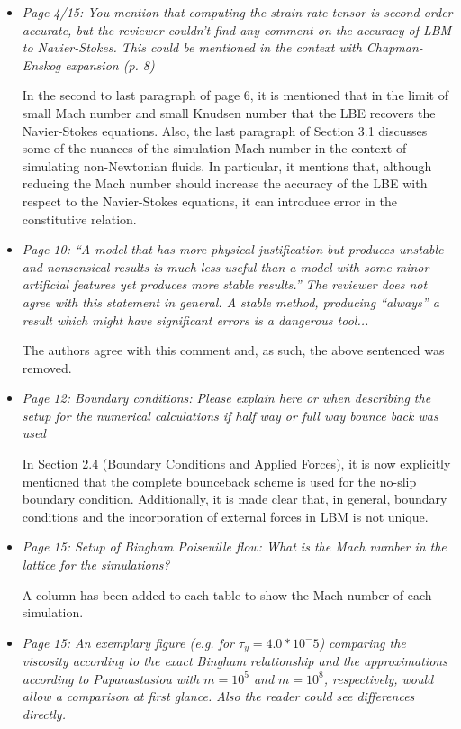 \documentclass{article}
\begin{document}
\begin{itemize}
	\item \emph{Page 4/15: You mention that computing the strain rate tensor is second order
		accurate, but the reviewer couldn’t find any comment on the accuracy of LBM to
		Navier-Stokes. This could be mentioned in the context with Chapman-Enskog
		expansion (p. 8)}
	
	In the second to last paragraph of page 6, it is mentioned that in the limit of small Mach number and small Knudsen number that the LBE recovers the Navier-Stokes equations.
	Also, the last paragraph of Section 3.1 discusses some of the nuances of the simulation Mach number in the context of simulating non-Newtonian fluids.
	In particular, it mentions that, although reducing the Mach number should increase the accuracy of the LBE with respect to the Navier-Stokes equations, it can introduce error in the constitutive relation.
	
	\item \emph{Page 10: ``A model that has more physical justification but produces unstable and
		nonsensical results is much less useful than a model with some minor artificial
		features yet produces more stable results.'' The reviewer does not agree with this
		statement in general. A stable method, producing ``always'' a result which might have
		significant errors is a dangerous tool...}
	
	The authors agree with this comment and, as such, the above sentenced was removed.
	
	\item \emph{Page 12: Boundary conditions: Please explain here or when describing the setup for
		the numerical calculations if half way or full way bounce back was used}
	
	In Section 2.4 (Boundary Conditions and Applied Forces), it is now explicitly mentioned that the complete bounceback scheme is used for the no-slip boundary condition.
	Additionally, it is made clear that, in general, boundary conditions and the incorporation of external forces in LBM is not unique.
	
	\item \emph{Page 15: Setup of Bingham Poiseuille flow: What is the Mach number in the lattice
		for the simulations?}
	
	A column has been added to each table to show the Mach number of each simulation.
	
	\item \emph{Page 15: An exemplary figure (e.g. for $\tau_y = 4.0*10^-5$) comparing the viscosity
		according to the exact Bingham relationship and the approximations according to
		Papanastasiou with $m=10^5$ and $m=10^8$, respectively, would allow a comparison at
		first glance. Also the reader could see differences directly.}
	

\end{itemize}
\end{document}
